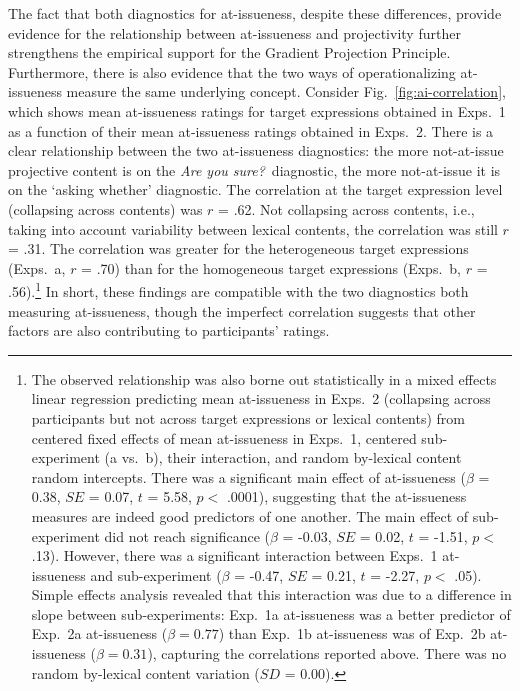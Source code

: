 \documentclass[11pt,fleqn]{article}
\newcommand{\6}{\mbox{$[\hspace*{-.6mm}[$}}
\newcommand{\9}{\mbox{$]\hspace*{-.6mm}]$}}
\newcommand{\figref}[1]{Fig.~\ref{#1}}
\begin{document}
The fact that both diagnostics for at-issueness, despite these differences, provide evidence for the relationship between at-issueness and projectivity  further strengthens the empirical support for the Gradient Projection Principle. Furthermore, there is also evidence that the two ways of operationalizing at-issueness measure the same underlying concept. Consider \figref{fig:ai-correlation}, which shows mean at-issueness ratings for target expressions obtained in Exps.~1 as a function of their mean at-issueness ratings obtained in Exps.~2. There is a clear relationship between the two at-issueness diagnostics: the more not-at-issue projective content is on the {\em Are you sure?}~diagnostic, the more not-at-issue it is on the `asking whether' diagnostic. The correlation at the target expression level (collapsing across contents) was $r$ = .62. Not collapsing across contents, i.e., taking into account variability between lexical contents, the correlation was still $r$ = .31. The correlation was greater for the heterogeneous target expressions (Exps.~a, $r$ = .70) than for the homogeneous target expressions (Exps.~b, $r$ = .56).\footnote{The observed relationship was also borne out statistically in a mixed effects linear regression predicting mean at-issueness in Exps.~2 (collapsing across participants but not across target expressions or lexical contents) from centered fixed effects of mean at-issueness in Exps.~1, centered sub-experiment (a vs.~b), their interaction, and random by-lexical content random intercepts. There was a significant main effect of at-issueness ($\beta$ = 0.38, $SE$ = 0.07, $t$ = 5.58, $p <$ .0001), suggesting that the at-issueness measures are indeed good predictors of one another. The main effect of sub-experiment did not reach significance  ($\beta$ = -0.03, $SE$ = 0.02, $t$ = -1.51, $p <$ .13). However, there was a significant interaction between Exps.~1 at-issueness and sub-experiment ($\beta$ = -0.47, $SE$ = 0.21, $t$ = -2.27, $p <$ .05). Simple effects analysis revealed that this interaction was due to a difference in slope between sub-experiments: Exp.~1a at-issueness was a better predictor of Exp.~2a at-issueness ($\beta = 0.77$) than Exp.~1b at-issueness was of Exp.~2b at-issueness ($\beta = 0.31$), capturing the correlations reported above. There was no random by-lexical content variation  ($SD$ = 0.00).} In short, these findings are compatible with the two diagnostics both measuring at-issueness, though the imperfect correlation suggests that other factors are also contributing to participants' ratings.
\end{document}

